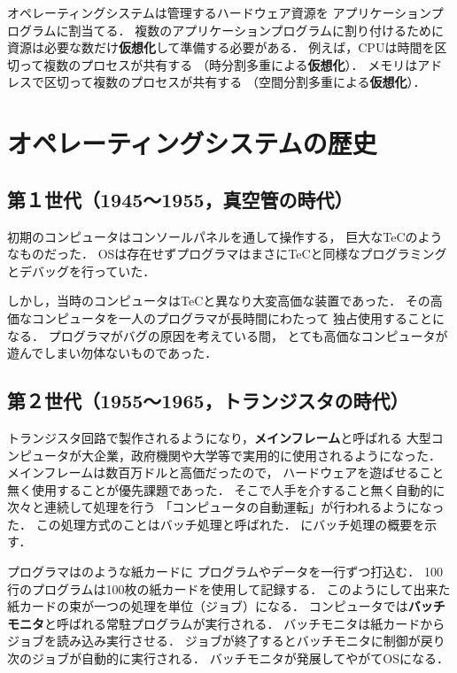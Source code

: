 オペレーティングシステムは管理するハードウェア資源を
アプリケーションプログラムに割当てる．
複数のアプリケーションプログラムに割り付けるために
資源は必要な数だけ{\bf 仮想化}して準備する必要がある．
例えば，CPUは時間を区切って複数のプロセスが共有する
（時分割多重による{\bf 仮想化}）．
メモリはアドレスで区切って複数のプロセスが共有する
（空間分割多重による{\bf 仮想化}）．


\section{オペレーティングシステムの歴史}

\subsection{第１世代（1945〜1955，真空管の時代）}
初期のコンピュータはコンソールパネルを通して操作する，
巨大なTeCのようなものだった．
OSは存在せずプログラマはまさにTeCと同様なプログラミングとデバッグを行っていた．

しかし，当時のコンピュータはTeCと異なり大変高価な装置であった．
その高価なコンピュータを一人のプログラマが長時間にわたって
独占使用することになる．
プログラマがバグの原因を考えている間，
とても高価なコンピュータが遊んでしまい勿体ないものであった．

\subsection{第２世代（1955〜1965，トランジスタの時代）}

トランジスタ回路で製作されるようになり，{\bf メインフレーム}と呼ばれる
大型コンピュータが大企業，政府機関や大学等で実用的に使用されるようになった．
メインフレームは数百万ドルと高価だったので，
ハードウェアを遊ばせること無く使用することが優先課題であった．
そこで人手を介すること無く自動的に次々と連続して処理を行う
「コンピュータの自動運転」が行われるようになった．
この処理方式のことはバッチ処理と呼ばれた．
にバッチ処理の概要を示す．

プログラマはのような紙カードに
プログラムやデータを一行ずつ打込む．
100行のプログラムは100枚の紙カードを使用して記録する．
このようにして出来た紙カードの束が一つの処理を単位（ジョブ）になる．
コンピュータでは{\bf バッチモニタ}と呼ばれる常駐プログラムが実行される．
バッチモニタは紙カードからジョブを読み込み実行させる．
ジョブが終了するとバッチモニタに制御が戻り次のジョブが自動的に実行される．
バッチモニタが発展してやがてOSになる．

